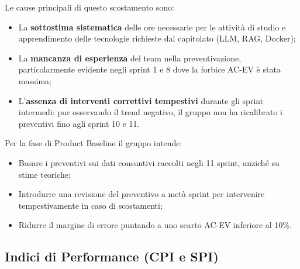 \documentclass[a4paper,11pt,oneside]{scrartcl}
\begin{document}
Le cause principali di questo scostamento sono:
\begin{itemize}
    \item La \textbf{sottostima sistematica} delle ore necessarie per le attività di studio e apprendimento delle tecnologie richieste dal capitolato (LLM, RAG, Docker);
    \item La \textbf{mancanza di esperienza} del team nella preventivazione, particolarmente evidente negli sprint 1 e 8 dove la forbice AC-EV è stata massima;
    \item L'\textbf{assenza di interventi correttivi tempestivi} durante gli sprint intermedi: pur osservando il trend negativo, il gruppo non ha ricalibrato i preventivi fino agli sprint 10 e 11.
\end{itemize}

Per la fase di Product Baseline il gruppo intende:
\begin{itemize}
    \item Basare i preventivi sui dati consuntivi raccolti negli 11 sprint, anziché su stime teoriche;
    \item Introdurre una revisione del preventivo a metà sprint per intervenire tempestivamente in caso di scostamenti;
    \item Ridurre il margine di errore puntando a uno scarto AC-EV inferiore al 10\%.
\end{itemize}

\subsection{Indici di Performance (CPI e SPI)}
\end{document}
